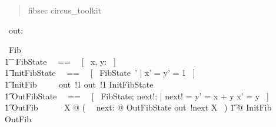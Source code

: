\documentclass{article}
\newenvironment{zsection}{\begin{quotation}}{\end{quotation}}
\begin{document}
\begin{zsection}
   \SECTION fibsec \parents circus\_toolkit
\end{zsection}

\begin{circus}
    \circchannel\ out: \nat
\end{circus}

\begin{circus}
    \circprocess\ Fib ~~\circdef~~ \circbegin \\
    	\t1 \circstate\ FibState ~~==~~ [~ x, y: \nat ~] \\
    	\t1 InitFibState ~~==~~ [~ FibState~' | x' = y' = 1 ~] \\
	\t1 InitFib ~~\circdef~~ out~!1 \then out~!1 \then InitFibState \\
	\t1 OutFibState ~~==~~ [~ \Delta FibState; next!: \nat | next! = y' = x + y \land x' = y ~] \\
	\t1 OutFib ~~\circdef~~ \circmu\ X @ (~ \circvar\ next: \nat @ OutFibState \circseq out~!next \then X ~)
	\t1 @ InitFib ~\circseq~ OutFib \\
    \circend
\end{circus}
\end{document}
